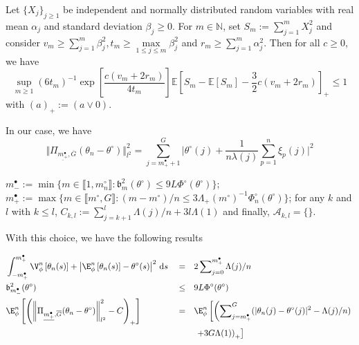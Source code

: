 \begin{lm*}
Let $\{X_{j}\}_{j \geq 1}$ be independent and normally distributed random variables with real mean $\alpha_{j}$ and standard deviation $\beta_{j} \geq 0$. For $m \in \mathds{N}$, set $S_{m} := \sum \limits_{j = 1}^{m} X_{j}^{2}$ and consider $v_{m} \geq \sum\limits_{j = 1}^{m} \beta_{j}^{2}, t_{m} \geq \max \limits_{1 \leq j \leq m} \beta_{j}^{2}$ and $r_{m} \geq \sum\limits_{j = 1}^{m} \alpha_{j}^{2}$.
Then for all $c \geq 0$, we have
\[\sup\limits_{m \geq 1}(6 t_{m})^{-1} \exp\left[\frac{c (v_{m} + 2 r_{m})}{4 t_{m}}\right] \mathds{E}\left[S_{m} - \mathds{E}[S_{m}] - \frac{3}{2} c (v_{m} + 2 r_{m})\right]_{+} \leq 1\]
with $(a)_{+} := (a \vee 0).$
\end{lm*}

In our case, we have
\[\Vert \Pi_{\underline{m^{\bullet}_{+}}, \overline{G}}(\theta_{n} - \theta^{\circ}) \Vert_{l^{2}}^{2} = \sum_{j = m^{\bullet}_{+} + 1}^{G} \vert \theta^{\circ}(j) + \frac{1}{n \lambda(j)} \sum_{p = 1}^{n} \xi_{p}(j)\vert^{2}\]


$m^{\bullet}_{-} := \min\{m \in \llbracket 1, m^{\circ}_{n} \rrbracket : \mathfrak{b}_{m}^{2}(\theta^{\circ}) \leq 9 L \Phi^{\circ}(\theta^{\circ})\}$; $m^{\bullet}_{+} := \max\{m \in \llbracket m^{\circ}, G \rrbracket : (m - m^{\circ})/n \leq 3 \Lambda_{+}(m^{\circ})^{-1} \Phi^{\circ}_{n}(\theta^{\circ})\}$; for any $k$ and $l$ with $k \leq l$, $C_{k, l} := \sum_{j = k + 1}^{l} \Lambda(j)/n +  3 l \Lambda(1)$ and finally, $\mathcal{A}_{k, l} = \{\}$.

With this choice, we have the following results

\begin{alignat*}{3}
& \int_{-m^{\bullet}_{+}}^{m^{\bullet}_{+}} \V_{\phi}^{n}\left[ \theta_{n}(s) \right] + \left\vert \E_{\phi}^{n}\left[ \theta_{n}(s) \right] - \theta^{\circ}(s) \right\vert^{2} \, \text{d}s && = && 2 \sum\nolimits_{j = 0}^{m^{\bullet}_{+}} \Lambda(j)/n \\
& \mathfrak{b}_{m^{\bullet}_{-}}^{2}(\theta^{\circ}) && \leq && 9 L \Phi^{\circ}(\theta^{\circ})\\
& \E_{\phi}^{n}\left[ \left(\left\Vert \Pi_{\underline{m^{\bullet}_{+}}, \overline{G}}(\theta_{n} - \theta^{\circ}) \right\Vert_{l^{2}}^{2} - C\right)_{+}\right] && = && \E_{\phi}^{n}\left[ \left(\sum\nolimits_{j = m^{\bullet}_{+}}^{G} (\vert \theta_{n}(j) - \theta^{\circ}(j) \vert^{2} - \Lambda(j)/n) \right.\right.\\
& && && \left.\left. +  3 G \Lambda(1)\right)_{+}\right]
\end{alignat*}






